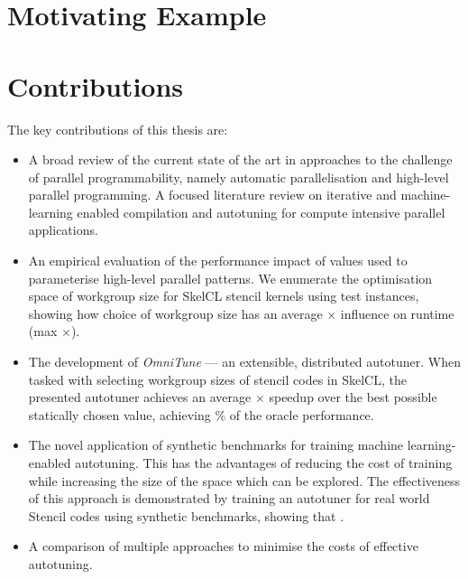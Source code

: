 

\section{Motivating Example}



\section{Contributions}

The key contributions of this thesis are:

\begin{itemize}
\item A broad review of the current state of the art in approaches to
  the challenge of parallel programmability, namely automatic
  parallelisation and high-level parallel programming. A focused
  literature review on iterative and machine-learning enabled
  compilation and autotuning for compute intensive parallel
  applications.
\item An empirical evaluation of the performance impact of values used
  to parameterise high-level parallel patterns. We enumerate the
  optimisation space of workgroup size for SkelCL stencil kernels
  using  test instances, showing how
  choice of workgroup size has an average
  $\times$ influence on runtime (max
  $\times$).
\item The development of \emph{OmniTune} --- an extensible,
  distributed autotuner. When tasked with selecting workgroup sizes of
  stencil codes in SkelCL, the presented autotuner achieves an average
  $\times$ speedup over the best possible statically chosen
  value, achieving \% of the oracle performance.
\item The novel application of synthetic  benchmarks for training machine learning-enabled
  autotuning. This has the advantages of reducing the cost of training
  while increasing the size of the space which can be explored. The
  effectiveness of this approach is demonstrated by training an
  autotuner for  real world Stencil codes
  using synthetic benchmarks, showing that .
\item A comparison of multiple approaches to minimise the costs of
  effective autotuning. 
\end{itemize}

